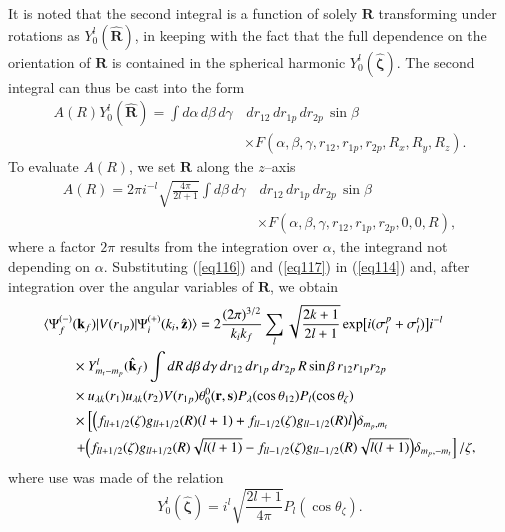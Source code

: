 It is noted that the second integral is a function of solely $\mathbf{R}$ transforming under rotations as $Y_0^{l}(\hat{\mathbf{R}})$, in keeping with the fact that the full dependence on the orientation of $\mathbf{R}$ is contained in the spherical harmonic $Y^{l}_0(\hat{\boldsymbol{\zeta}})$. The second integral can thus be cast into the form
\begin{equation}\label{eq116}
  \begin{split}
A(R)Y_0^{l}(\hat{\mathbf{R}})=\int d\alpha\, d\beta\, d\gamma &\, dr_{12}\,dr_{1p}\,dr_{2p}\,\sin\beta \\ &\times F(\alpha,\beta,\gamma,r_{12},r_{1p},r_{2p},R_x,R_y,R_z).
  \end{split}
\end{equation}
To evaluate $A(R)$, we set $\mathbf{R}$ along the $z$--axis
\begin{equation}\label{eq117}
  \begin{split}
A(R)=2\pi i^{-l}\sqrt{\frac{4\pi}{2l+1}}\int  d\beta\, d\gamma &\, dr_{12}\,dr_{1p}\,dr_{2p}\,\sin\beta \\ &\times F(\alpha,\beta,\gamma,r_{12},r_{1p},r_{2p},0,0,R),
  \end{split}
\end{equation}
where a factor $2\pi$  results from the integration over $\alpha$, the integrand not depending on $\alpha$. Substituting (\ref{eq116}) and (\ref{eq117}) in (\ref{eq114}) and, after integration over the angular variables of $\mathbf{R}$, we obtain
\begin{equation}\label{eq118}
  \begin{split}
  \langle \Psi_f^{(-)}&(\mathbf{k}_f)|V(r_{1p})|\Psi_i^{(+)}(k_i,\hat {\mathbf{z}})\rangle=2\frac{(2\pi)^{3/2}}{k_ik_f}\sum_{l}
  \sqrt{\frac{2k+1}{2l+1}}\exp\bigl[i(\sigma_{l}^p+\sigma_{l}^t)\bigr]i^{-l}\\
  &\times Y_{m_t-m_p}^{l}(\hat{\mathbf{k}}_f) \int dR \, d\beta\, d\gamma \, dr_{12}\,dr_{1p}\,dr_{2p}\,R\sin\beta \, r_{12}r_{1p}r_{2p}  \\
  &\times u_{\lambda k}(r_1)u_{\lambda k}(r_2)V(r_{1p})\theta_0^0(\mathbf{r},\mathbf{s})
  P_\lambda(\cos \theta_{12})P_l(\cos \theta_\zeta)\\
  &\times \left[\Bigl(f_{ll+1/2}(\zeta)g_{ll+1/2}(R)(l+1)+f_{ll-1/2}(\zeta)g_{ll-1/2}(R)l\Bigr)\delta_{m_p,m_t}\right.\\
  &\left.+\Bigl(f_{ll+1/2}(\zeta)g_{ll+1/2}(R)\sqrt{l(l+1)}-f_{ll-1/2}(\zeta)g_{ll-1/2}(R)
  \sqrt{l(l+1)}\Bigr)\delta_{m_p,-m_t}\right]/\zeta,
  \end{split}
\end{equation}
where  use was made of the relation
\begin{equation}\label{eq119}
Y^{l}_0(\hat{\boldsymbol{\zeta}})=i^l\sqrt{\frac{2l+1}{4\pi}}P_l(\cos \theta_\zeta).
\end{equation}



